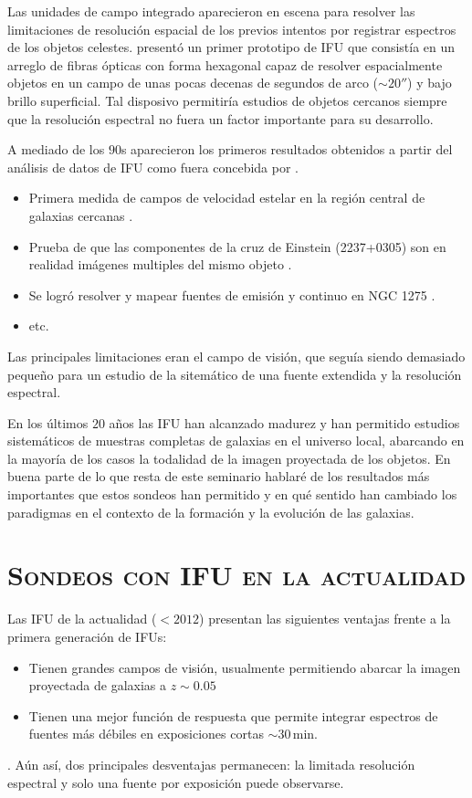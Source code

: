\documentclass{article}
\begin{document}
Las unidades de campo integrado \citep[IFU en inglés][]{Vanderriest1980} aparecieron en escena para
resolver las limitaciones de resolución espacial de los previos intentos por registrar espectros de
los objetos celestes. \citeauthor{Vanderriest1980} presentó un primer prototipo de IFU que consistía
en un arreglo de fibras ópticas con forma hexagonal capaz de resolver espacialmente objetos en un
campo de unas pocas decenas de segundos de arco ($\sim20''$) y bajo brillo superficial. Tal
disposivo permitiría estudios de objetos cercanos siempre que la resolución espectral no fuera un
factor importante para su desarrollo.

A mediado de los $90$s aparecieron los primeros resultados obtenidos a partir del análisis de datos
de IFU como fuera concebida por \citet{Courtes1982} \citep[véase][para un resumen de los hallazgos
con el dispositivo TIGER]{Bacon1995}.

\begin{itemize}
%
\item Primera medida de campos de velocidad estelar en la región central de galaxias cercanas
\citep{Bacon1995}.
%
\item Prueba de que las componentes de la cruz de Einstein (2237+0305) son en realidad imágenes
multiples del mismo objeto \citep{Fitte1994}.
%
\item Se logró resolver y mapear fuentes de emisión y continuo en NGC 1275 \citep{Ferruit1994}.
%
\item etc.
%
\end{itemize}
%
Las principales limitaciones eran el campo de visión, que seguía siendo demasiado pequeño para un
estudio de la sitemático de una fuente extendida y la resolución espectral.

En los últimos $20$ años las IFU han alcanzado madurez y han permitido estudios sistemáticos de
muestras completas de galaxias en el universo local, abarcando en la mayoría de los casos la
todalidad de la imagen proyectada de los objetos. En buena parte de lo que resta de este seminario
hablaré de los resultados más importantes que estos sondeos han permitido y en qué sentido han
cambiado los paradigmas en el contexto de la formación y la evolución de las galaxias.



\section{\textsc{Sondeos con IFU en la actualidad}}
%
Las IFU de la actualidad ($<2012$) presentan las siguientes ventajas frente a la primera generación
de IFUs:
%
\begin{itemize}
%
\item Tienen grandes campos de visión, usualmente permitiendo abarcar la imagen
proyectada de galaxias a $z\sim0.05$
%
\item Tienen una mejor función de respuesta que permite integrar espectros de fuentes más débiles en
exposiciones cortas $\sim30\,$min.
%
\end{itemize}.
%
Aún así, dos principales desventajas permanecen: la limitada resolución espectral y solo una fuente
por exposición puede observarse.
%
\end{document}
